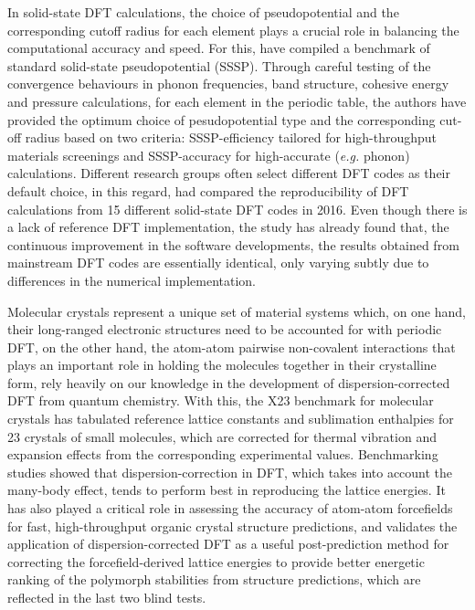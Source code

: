 In solid-state DFT calculations, the choice of pseudopotential and the corresponding cutoff radius for each element plays a crucial role in balancing the computational accuracy and speed. For this, \citet{prandini2018precision} have compiled a benchmark of standard solid-state pseudopotential (SSSP). Through careful testing of the convergence behaviours in phonon frequencies, band structure, cohesive energy and pressure calculations, for each element in the periodic table, the authors have provided the optimum choice of pesudopotential type and the corresponding cut-off radius based on two criteria: SSSP-efficiency tailored for high-throughput materials screenings and SSSP-accuracy for high-accurate (\emph{e.g.} phonon) calculations. Different research groups often select different DFT codes as their default choice, in this regard, \citet{lejaeghere2016reproducibility} had compared the reproducibility of DFT calculations from 15 different solid-state DFT codes in 2016. Even though there is a lack of reference DFT implementation, the study has already found that, the continuous improvement in the software developments, the results obtained from mainstream DFT codes are essentially identical, only varying subtly due to differences in the numerical implementation. 

Molecular crystals represent a unique set of material systems which, on one hand, their long-ranged electronic structures need to be accounted for with periodic DFT, on the other hand, the atom-atom pairwise non-covalent interactions that plays an important role in holding the molecules together in their crystalline form, rely heavily on our knowledge in the development of dispersion-corrected DFT from quantum chemistry. With this, the X23 benchmark for molecular crystals\cite{otero2012benchmark,reilly2013understanding,dolgonos2019revised} has tabulated reference lattice constants and sublimation enthalpies for 23 crystals of small molecules, which are  corrected for thermal vibration and expansion effects from the corresponding experimental values. Benchmarking studies showed that dispersion-correction in DFT, which takes into account the many-body effect, tends to perform best in reproducing the lattice energies. It has also played a critical role in assessing the accuracy of atom-atom forcefields for fast, high-throughput organic crystal structure predictions,\cite{nyman2016accurate}  and validates the application of dispersion-corrected DFT as a useful post-prediction method for correcting the forcefield-derived lattice energies to provide better energetic ranking of the polymorph stabilities from structure predictions, which are reflected in the last two blind tests.\cite{reilly2016report,Hunnisett:aw5094}

